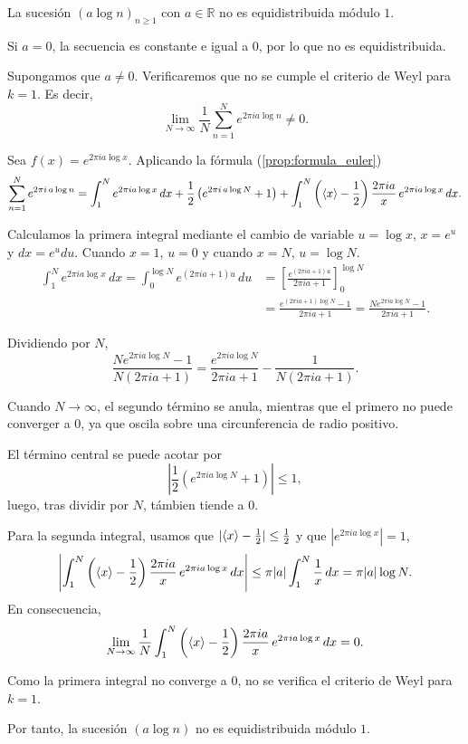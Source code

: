\begin{example}
    La sucesión $(a\log n)_{n\geq1}$ con $a \in \mathbb{R}$ no es equidistribuida módulo $1$.
\end{example}

\begin{resolve}
    Si $a = 0$, la secuencia es constante e igual a $0$, por lo que no es equidistribuida.
    
    Supongamos que $a \neq 0$. Verificaremos que no se cumple el criterio de Weyl para $k=1$. 
    Es decir,
    \[
        \lim_{N \to \infty} \frac{1}{N} \sum_{n=1}^N e^{2\pi i a \log n} \neq 0.
    \]   
    
    Sea $f(x) = e^{2\pi i a \log x}$. Aplicando la fórmula (\ref{prop:formula_euler})
    \[
        \sum_{n=1}^N e^{2\pi i \, a \log n} =
        \int_1^N e^{2\pi i a \log x} \, dx +
        \frac{1}{2} \left(e^{2\pi i \, a \log N} + 1\right) +
        \int_1^N \left(\langle x \rangle - \frac{1}{2}\right) \frac{2\pi i a}{x} \, e^{2\pi i a \log x} \, dx .
    \]
    
    Calculamos la primera integral mediante el cambio de variable $u = \log x$,
    $x = e^u$ y $dx = e^u du$. Cuando $x = 1$, $u = 0$ y cuando $x = N$, $u = \log N$.
    \begin{align*}
        \int_1^N e^{2\pi i a \log x} \, dx 
        = \int_0^{\log N} e^{(2\pi i a + 1) u} \, du 
        &= \left[\frac{e^{(2\pi i a + 1) u}}{2\pi i a + 1}\right]_0^{\log N} \\ 
        &= \frac{e^{(2\pi i a + 1) \log N} - 1}{2\pi i a + 1} 
        = \frac{N e^{2\pi i a \log N} - 1}{2\pi i a + 1}.
    \end{align*}
        
    Dividiendo por $N$, 
    \[
        \frac{N e^{2\pi i a \log N} - 1}{N(2\pi i a + 1)}
        = \frac{e^{2\pi i a \log N}}{2\pi i a + 1} - \frac{1}{N(2\pi i a + 1)}.
    \]

    Cuando $N \to \infty$, el segundo término se anula, mientras que el primero 
    no puede converger a $0$, ya que oscila sobre una circunferencia de radio positivo.

    El término central se puede acotar por
    \[
        \left|\frac{1}{2} \left(e^{2\pi i a \log N} + 1\right)\right| \leq 1,
    \]
    luego, tras dividir por $N$, támbien tiende a $0$.

    Para la segunda integral, usamos que $|\langle x \rangle - \frac{1}{2}| \leq \frac{1}{2}$ y que $|e^{2\pi i a \log x}| = 1$,
    \[
        \left|\int_1^N \left(\langle x \rangle - \frac{1}{2}\right) \dfrac{2\pi i a}{x} \, e^{2\pi i a \log x} \, dx\right|
        \leq \pi |a| \int_1^N \frac{1}{x} \, dx
        = \pi |a| \log N.
    \]
    En consecuencia,
    \[
        \lim_{N \to \infty} \frac{1}{N} \int_1^N \left(\langle x \rangle - \frac{1}{2}\right) \dfrac{2\pi i a}{x} \, e^{2\pi i a \log x} \, dx = 0.
    \]

    Como la primera integral no converge a $0$, no se verifica el criterio de Weyl para $k=1$.
    
    Por tanto, la sucesión $(a\log n)$ no es equidistribuida módulo $1$.   
\end{resolve}
